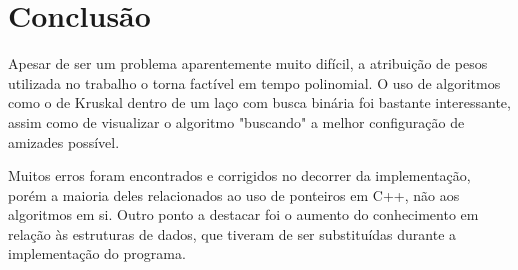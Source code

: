 \documentclass[a4paper,12pt,titlepage]{article}
\begin{document}
\section{Conclusão}

Apesar de ser um problema aparentemente muito difícil, a atribuição de pesos utilizada no trabalho o torna factível em tempo polinomial. O uso de algoritmos como o de Kruskal dentro de um laço com busca binária foi bastante interessante, assim como de visualizar o algoritmo "buscando" a melhor configuração de amizades possível.

Muitos erros foram encontrados e corrigidos no decorrer da implementação, porém a maioria deles relacionados ao uso de ponteiros em C++, não aos algoritmos em si. Outro ponto a destacar foi o aumento do conhecimento em relação às estruturas de dados, que tiveram de ser substituídas durante a implementação do programa.


\newpage
\end{document}
